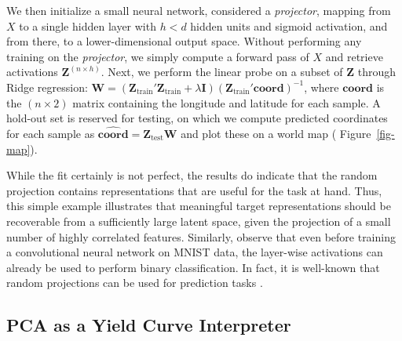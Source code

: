 \documentclass{article}
\theoremstyle{plain}
\theoremstyle{definition}
\theoremstyle{remark}
\begin{document}
We then initialize a small neural network, considered a \emph{projector}, mapping from \(X\) to a single hidden layer with \(h<d\) hidden units and sigmoid activation, and from there, to a lower-dimensional output space. Without performing any training on the \emph{projector}, we simply compute a forward pass of \(X\) %
and retrieve activations \(\mathbf{Z}^{(n\times h)}\). Next, we perform the linear probe on a subset of \(\mathbf{Z}\) through Ridge regression: \(\mathbf{W} = (\mathbf{Z}_{\text{train}}'\mathbf{Z}_{\text{train}} + \lambda \mathbf{I}) (\mathbf{Z}_{\text{train}}'\textbf{coord})^{-1}\), where \(\textbf{coord}\) is the \((n \times 2)\) matrix containing the longitude and latitude for each sample. A hold-out set is reserved for testing, on which we compute predicted coordinates for each sample as \(\widehat{\textbf{coord}}=\mathbf{Z}_{\text{test}}\mathbf{W}\) and plot these on a world map ( Figure~\ref{fig-map}).  

While the fit certainly is not perfect, the results do indicate that the random projection contains representations that are useful for the task at hand. Thus, %
this simple example illustrates that meaningful target representations should be recoverable from a sufficiently large latent space, given the projection of a small number of highly correlated features. Similarly, \citet{alain2018understanding} observe that even before training a convolutional neural network on MNIST data, the layer-wise activations can already be used to perform binary classification. In fact, it is well-known that random projections can be used for prediction tasks \cite{dasgupta2013experiments}.


\subsection{PCA as a Yield Curve Interpreter}\label{example-principal-component-analysis}
\end{document}
